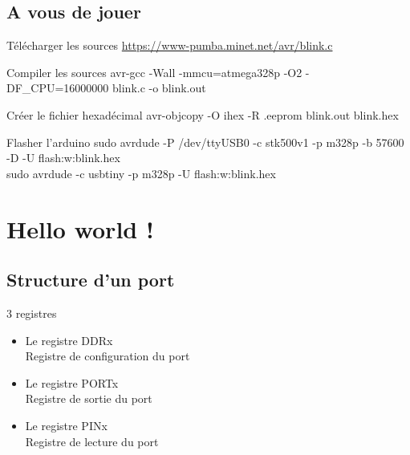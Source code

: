\documentclass{beamer}
\begin{document}
\subsection{A vous de jouer}

\begin{frame}
  \begin{block}{T\'el\'echarger les sources}
    \pause
    \hyperlink{https://www-pumba.minet.net/avr/blink.c}{https://www-pumba.minet.net/avr/blink.c}
  \end{block}
  \pause
  \begin{block}{Compiler les sources}
    \pause
    avr-gcc -Wall -mmcu=atmega328p -O2 -DF\_CPU=16000000 blink.c -o blink.out
  \end{block}
  \pause  
  \begin{block}{Cr\'eer le fichier hexad\'ecimal}
    \pause
    avr-objcopy -O ihex -R .eeprom blink.out blink.hex
  \end{block}
  \pause
  \begin{block}{Flasher l'arduino}
    \pause
    sudo avrdude -P /dev/ttyUSB0 -c stk500v1 -p m328p -b 57600 -D -U flash:w:blink.hex\\
    sudo avrdude -c usbtiny -p m328p -U flash:w:blink.hex
  \end{block}
\end{frame}

\section{Hello world !}

\begin{frame}
  \tableofcontents[currentsection]
\end{frame}

\subsection{Structure d'un port}

\begin{frame}
  \pause
  \begin{block}{3 registres}
    \begin{itemize}
      \pause
      \item Le registre DDRx\\
      Registre de configuration du port
      \pause
      \item Le registre PORTx\\
      Registre de sortie du port
      \pause
      \item Le registre PINx\\
      Registre de lecture du port
    \end{itemize}
  \end{block}
\end{frame}
\end{document}
